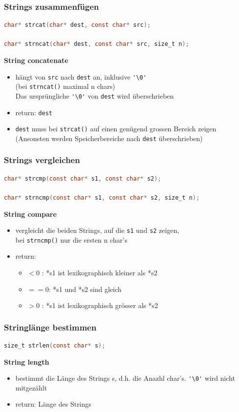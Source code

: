 		\subsubsection{Strings zusammenfügen}
			\begin{lstlisting}[language=C]
char* strcat(char* dest, const char* src);

char* strncat(char* dest, const char* src, size_t n);
			\end{lstlisting}
			\textbf{String concatenate}
				\begin{itemize}
					\item hängt von \verb|src| nach \verb|dest| an, inklusive \verb|'\0'| \\
					(bei \verb|strncat()| maximal n chars) \\
					Das ursprüngliche \verb|'\0'| von \verb|dest| wird überschrieben 
					\item return: \verb|dest|
					\item \verb|dest| muss bei \verb|strcat()| auf einen genügend grossen Bereich zeigen\\ (Ansonsten werden Speicherbereiche nach \verb|dest| überschrieben)
				\end{itemize}

		\subsubsection{Strings vergleichen}
			\begin{lstlisting}[language=C]
char* strcmp(const char* s1, const char* s2);

char* strncmp(const char* s1, const char* s2, size_t n);
			\end{lstlisting}
			\textbf{String compare}
				\begin{itemize}
					\item vergleicht die beiden Strings, auf die \verb|s1| und \verb|s2| zeigen,\\
					bei \verb|strncmp()| nur die ersten n char's
					\item return:
					\begin{itemize}
						\item $<0$ : *s1 ist lexikographisch kleiner als *s2
						\item $==0$: *s1 und *s2 sind gleich
						\item $>0$ : *s1 ist lexikographisch grösser als *s2
					\end{itemize}
				\end{itemize}
		\subsubsection{Stringlänge bestimmen}
			\begin{lstlisting}[language=C]
size_t strlen(const char* s);
			\end{lstlisting}
			\textbf{String length}
				\begin{itemize}
					\item bestimmt die Länge des Strings s, d.h. die Anazhl char's. \verb|'\0'| wird nicht mitgezählt 
					\item return: Länge des Strings
				\end{itemize}
